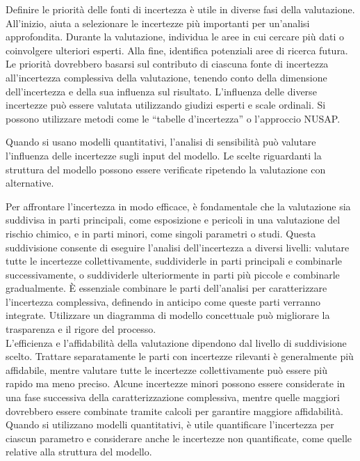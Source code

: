 Definire le priorità delle fonti di incertezza è utile in diverse fasi della valutazione. All'inizio, aiuta a selezionare le incertezze più importanti per un'analisi approfondita. Durante la valutazione, individua le aree in cui cercare più dati o coinvolgere ulteriori esperti. Alla fine, identifica potenziali aree di ricerca futura. Le priorità dovrebbero basarsi sul contributo di ciascuna fonte di incertezza all'incertezza complessiva della valutazione, tenendo conto della dimensione dell'incertezza e della sua influenza sul risultato.
L'influenza delle diverse incertezze può essere valutata utilizzando giudizi esperti e scale ordinali. Si possono utilizzare metodi come le “tabelle d'incertezza” o l'approccio NUSAP.

Quando si usano modelli quantitativi, l'analisi di sensibilità può valutare l'influenza delle incertezze sugli input del modello. Le scelte riguardanti la struttura del modello possono essere verificate ripetendo la valutazione con alternative.

Per affrontare l'incertezza in modo efficace, è fondamentale che la valutazione sia suddivisa in parti principali, come esposizione e pericoli in una valutazione del rischio chimico, e in parti minori, come singoli parametri o studi. Questa suddivisione consente di eseguire l'analisi dell'incertezza a diversi livelli: valutare tutte le incertezze collettivamente, suddividerle in parti principali e combinarle successivamente, o suddividerle ulteriormente in parti più piccole e combinarle gradualmente. È essenziale combinare le parti dell'analisi per caratterizzare l'incertezza complessiva, definendo in anticipo come queste parti verranno integrate. Utilizzare un diagramma di modello concettuale può migliorare la trasparenza e il rigore del processo.\\

L'efficienza e l'affidabilità della valutazione dipendono dal livello di suddivisione scelto. Trattare separatamente le parti con incertezze rilevanti è generalmente più affidabile, mentre valutare tutte le incertezze collettivamente può essere più rapido ma meno preciso. Alcune incertezze minori possono essere considerate in una fase successiva della caratterizzazione complessiva, mentre quelle maggiori dovrebbero essere combinate tramite calcoli per garantire maggiore affidabilità. Quando si utilizzano modelli quantitativi, è utile quantificare l'incertezza per ciascun parametro e considerare anche le incertezze non quantificate, come quelle relative alla struttura del modello.\\

